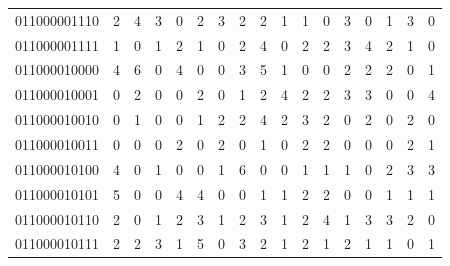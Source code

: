 \documentclass[10pt,a4paper]{article}
\begin{document}
\begin{longtable}{ |c|c|c|c|c|c|c|c|c|c|c|c|c|c|c|c|c| }
    011000001110              & 2                            & 4                                & 3                            & 0                              & 2   & 3   & 2   & 2   & 1   & 1   & 0   & 3   & 0   & 1   & 3   & 0   \\
    011000001111              & 1                            & 0                                & 1                            & 2                              & 1   & 0   & 2   & 4   & 0   & 2   & 2   & 3   & 4   & 2   & 1   & 0   \\
    011000010000              & 4                            & 6                                & 0                            & 4                              & 0   & 0   & 3   & 5   & 1   & 0   & 0   & 2   & 2   & 2   & 0   & 1   \\
    011000010001              & 0                            & 2                                & 0                            & 0                              & 2   & 0   & 1   & 2   & 4   & 2   & 2   & 3   & 3   & 0   & 0   & 4   \\
    011000010010              & 0                            & 1                                & 0                            & 0                              & 1   & 2   & 2   & 4   & 2   & 3   & 2   & 0   & 2   & 0   & 2   & 0   \\
    011000010011              & 0                            & 0                                & 0                            & 2                              & 0   & 2   & 0   & 1   & 0   & 2   & 2   & 0   & 0   & 0   & 2   & 1   \\
    011000010100              & 4                            & 0                                & 1                            & 0                              & 0   & 1   & 6   & 0   & 0   & 1   & 1   & 1   & 0   & 2   & 3   & 3   \\
    011000010101              & 5                            & 0                                & 0                            & 4                              & 4   & 0   & 0   & 1   & 1   & 2   & 2   & 0   & 0   & 1   & 1   & 1   \\
    011000010110              & 2                            & 0                                & 1                            & 2                              & 3   & 1   & 2   & 3   & 1   & 2   & 4   & 1   & 3   & 3   & 2   & 0   \\
    011000010111              & 2                            & 2                                & 3                            & 1                              & 5   & 0   & 3   & 2   & 1   & 2   & 1   & 2   & 1   & 1   & 0   & 1   \\

\end{longtable}
\end{document}
